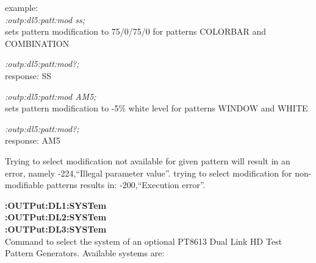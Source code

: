 example:\\
\textit{:outp:dl5:patt:mod ss;}\\
sets pattern modification to 75/0/75/0 for patterns COLORBAR and COMBINATION

\textit{:outp:dl5:patt:mod?;}\\
response: SS

\textit{:outp:dl5:patt:mod AM5;}\\
sets pattern modification to -5\% white level for patterns WINDOW and WHITE

\textit{:outp:dl5:patt:mod?;}\\
response: AM5

Trying to select modification not available for given pattern will result in an error, namely -224,``Illegal parameter value''. trying to select modification for non-modifiable patterns results in: -200,``Execution error''.

\textbf{:OUTPut:DL1:SYSTem}\\
\textbf{:OUTPut:DL2:SYSTem}\\
\textbf{:OUTPut:DL3:SYSTem}\\
Command to select the system of an optional PT8613 Dual Link HD Test Pattern Generators.  Available systems are:

